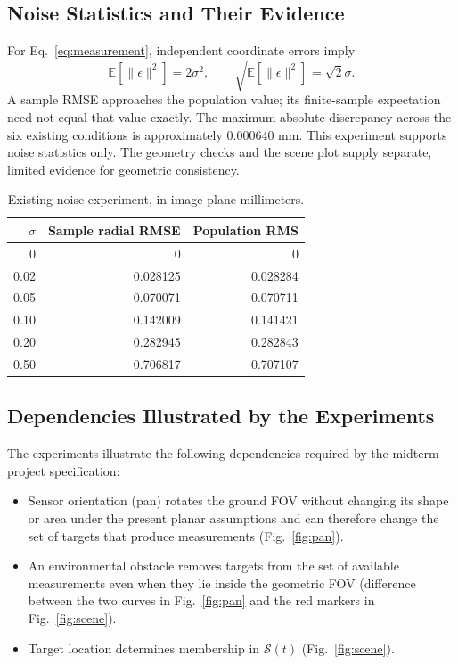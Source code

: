 \documentclass[11pt,letterpaper]{article}
\begin{document}
\subsection{Noise Statistics and Their Evidence}
For Eq.~\eqref{eq:measurement}, independent coordinate errors imply
\begin{equation}
\mathbb{E}[\|\epsilon\|^2]=2\sigma^2,\qquad
\sqrt{\mathbb{E}[\|\epsilon\|^2]}=\sqrt{2}\sigma.
\end{equation}
A sample RMSE approaches the population value; its finite-sample expectation need not equal that value exactly. The maximum absolute discrepancy across the six existing conditions is approximately $0.000640$ mm. This experiment supports noise statistics only. The geometry checks and the scene plot supply separate, limited evidence for geometric consistency.
\begin{table}[htbp]
\centering
\caption{Existing noise experiment, in image-plane millimeters.}
\begin{tabular}{rrr}\toprule
$\sigma$ & Sample radial RMSE & Population RMS\\\midrule
0&0&0\\0.02&0.028125&0.028284\\0.05&0.070071&0.070711\\
0.10&0.142009&0.141421\\0.20&0.282945&0.282843\\
0.50&0.706817&0.707107\\\bottomrule
\end{tabular}
\end{table}

\subsection{Dependencies Illustrated by the Experiments}
The experiments illustrate the following dependencies required by the midterm project specification:
\begin{itemize}
    \item Sensor orientation (pan) rotates the ground FOV without changing its shape or area under the present planar assumptions and can therefore change the set of targets that produce measurements (Fig.~\ref{fig:pan}).
    \item An environmental obstacle removes targets from the set of available measurements even when they lie inside the geometric FOV (difference between the two curves in Fig.~\ref{fig:pan} and the red markers in Fig.~\ref{fig:scene}).
    \item Target location determines membership in $\mathcal{S}(t)$ (Fig.~\ref{fig:scene}).
\end{itemize}
\end{document}
